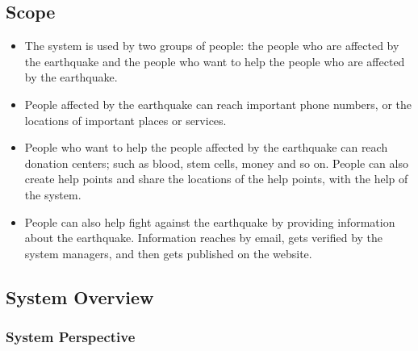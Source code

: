 \documentclass[a4paper]{article}
\begin{document}
            \subsection{Scope}
            \begin{itemize}
                \item The system is used by two groups of people: the people who are affected by the earthquake and the people who want to help the people who are affected by the earthquake.
                \item People affected by the earthquake can reach important phone numbers, or the locations of important places or services.
                \item People who want to help the people affected by the earthquake can reach donation centers; such as blood, stem cells, money and so on. People can also create help points and share the locations of the help points, with the help of the system.
                \item People can also help fight against the earthquake by providing information about the earthquake. Information reaches by email, gets verified by the system managers, and then gets published on the website.
            \end{itemize}

            \subsection{System Overview}

                \subsubsection{System Perspective}

                \begin{figure}
                    \centering
                    \fbox{}
                \end{figure}
\end{document}
